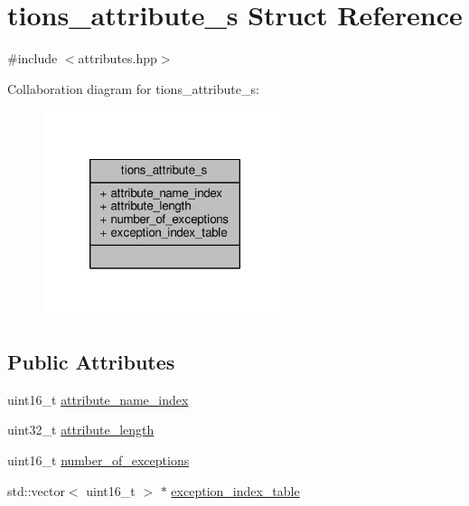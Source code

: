 \hypertarget{structtions__attribute__s}{\section{tions\+\_\+attribute\+\_\+s Struct Reference}
\label{structtions__attribute__s}
}


{\ttfamily \#include $<$attributes.\+hpp$>$}



Collaboration diagram for tions\+\_\+attribute\+\_\+s\+:\nopagebreak
\begin{figure}[H]
\begin{center}
\leavevmode
\includegraphics[width=202pt]{structtions__attribute__s__coll__graph}
\end{center}
\end{figure}
\subsection*{Public Attributes}
\begin{DoxyCompactItemize}
\item 
uint16\+\_\+t \hyperlink{structtions__attribute__s_a9b8db8dc3f0a915e0ea293b4a02aced5}{attribute\+\_\+name\+\_\+index}
\item 
uint32\+\_\+t \hyperlink{structtions__attribute__s_ab0b8c06d504e802ce01a0943bbd9bf10}{attribute\+\_\+length}
\item 
uint16\+\_\+t \hyperlink{structtions__attribute__s_a742ecd8b40b51ba831806ec14299c053}{number\+\_\+of\+\_\+exceptions}
\item 
std\+::vector$<$ uint16\+\_\+t $>$ $\ast$ \hyperlink{structtions__attribute__s_affcf7f1a4bad06d919af96858d87a9e6}{exception\+\_\+index\+\_\+table}
\end{DoxyCompactItemize}



